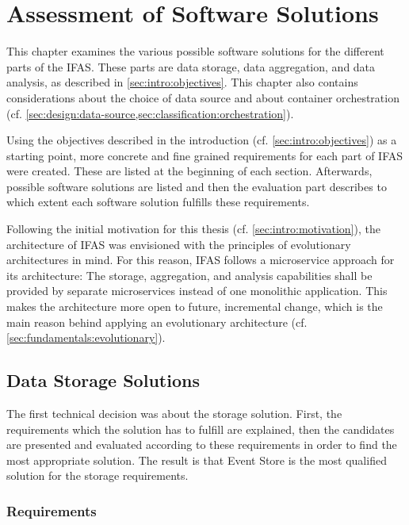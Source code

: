 %
\chapter{Assessment of Software Solutions}
\label{ch:classifications}

This chapter examines the various possible software solutions for the different parts of the \acf{IFAS}.
These parts are data storage, data aggregation, and data analysis, as described in \cref{sec:intro:objectives}.
This chapter also contains considerations about the choice of data source and about container orchestration (cf. \cref{sec:design:data-source,sec:classification:orchestration}).

Using the objectives described in the introduction (cf. \cref{sec:intro:objectives}) as a starting point, more concrete and fine grained requirements for each part of \ac{IFAS} were created.
These are listed at the beginning of each section.
Afterwards, possible software solutions are listed and then the evaluation part describes to which extent each software solution fulfills these requirements.

Following the initial motivation for this thesis (cf. \cref{sec:intro:motivation}), the architecture of \ac{IFAS} was envisioned with the principles of evolutionary architectures in mind.
For this reason, \ac{IFAS} follows a microservice approach for its architecture: The storage, aggregation, and analysis capabilities shall be provided by separate microservices instead of one monolithic application.
This makes the architecture more open to future, incremental change, which is the main reason behind applying an evolutionary architecture (cf. \cref{sec:fundamentals:evolutionary}).

\section{Data Storage Solutions}
\label{sec:classifications:storage}

The first technical decision was about the storage solution.
First, the requirements which the solution has to fulfill are explained, then the candidates are presented and evaluated according to these requirements in order to find the most appropriate solution.
The result is that Event Store is the most qualified solution for the storage requirements.

\subsection{Requirements}
\label{subsec:classifications:storage:req}

